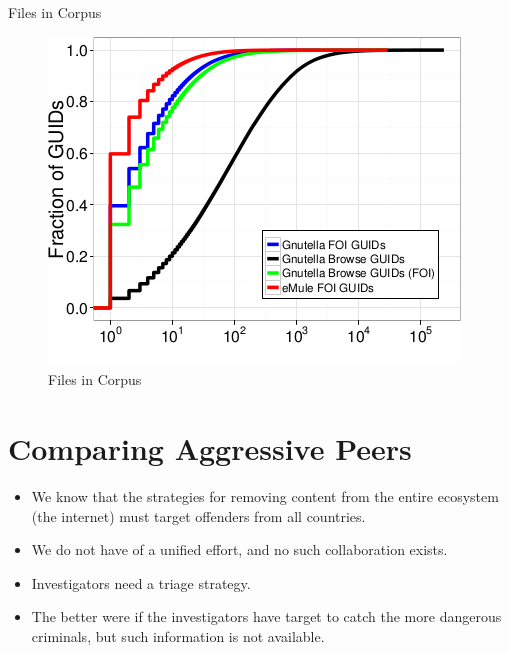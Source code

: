 \documentclass[notes]{beamer}
\begin{document}
\begin{frame}

\begin{block}{Files in Corpus}

\begin{figure}[!htb]
\centering
\includegraphics[scale=0.5]{Files_in_Corpus}
\caption{Files in Corpus}
\label{fig:Files_in_Corpus}
\end{figure}

\end{block}

\end{frame}

\section{Comparing Aggressive Peers}
\begin{frame}

\begin{itemize}

\item[\checkmark]We know that the strategies for removing content from the entire ecosystem (the internet) must target offenders from all countries.

\item[\checkmark]We do not have of a unified effort, and no such collaboration exists.

\item[\checkmark]Investigators need a triage strategy.

\item[\checkmark]The better were if the investigators have target to catch the more dangerous criminals, but such information is not available.

\end{itemize}

\end{frame}
\end{document}
